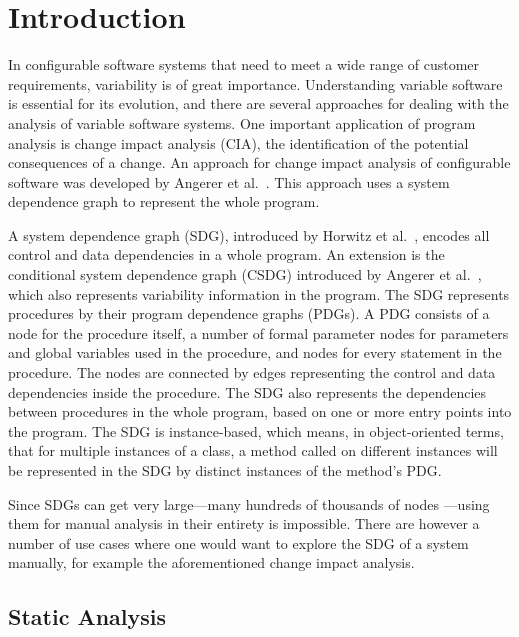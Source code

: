 \chapter{Introduction}

In configurable software systems that need to meet a wide range of customer requirements, variability is of great 
importance. Understanding variable software is essential for its evolution, and there are several approaches for 
dealing with the analysis of variable software systems. One important application of program analysis is change impact 
analysis (CIA), the identification of the potential consequences of a change. An approach for change impact analysis of 
configurable software was developed by Angerer et al.\ \cite{DBLP:conf/kbse/AngererGPG15}. This approach uses a system 
dependence graph to represent the whole program.

A system dependence graph (SDG), introduced by Horwitz et al.\ \cite{DBLP:journals/toplas/HorwitzRB90}, encodes all 
control and data dependencies in a whole program. An extension is the conditional system dependence graph (CSDG) 
introduced by Angerer et al.\ \cite{DBLP:conf/splc/AngererPLGG14}, which also represents variability information in the 
program. The SDG represents procedures by their program dependence graphs (PDGs). A PDG consists of a node for the 
procedure itself, a number of formal parameter nodes for parameters and global variables used in the procedure, and 
nodes for every statement in the procedure. The nodes are connected by edges representing the control and data 
dependencies inside the procedure. The SDG also represents the dependencies between procedures in the whole program, 
based on one or more entry points into the program. The SDG is instance-based, which means, in object-oriented terms, 
that for multiple instances of a class, a method called on different instances will be represented in the SDG by 
distinct instances of the method's PDG.

Since SDGs can get very large---many hundreds of thousands of nodes 
\cite[sec.~4.3]{DBLP:conf/splc/AngererPLGG14}---using them for manual analysis in their entirety is impossible. There 
are however a number of use cases where one would want to explore the SDG of a system manually, for example the 
aforementioned change impact analysis.


\section{Static Analysis}


